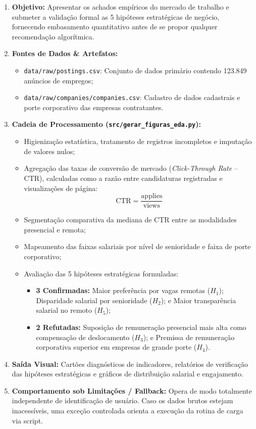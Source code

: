 \begin{enumerate}[label=\textbf{\arabic*.}]
    \item \textbf{Objetivo:} Apresentar os achados empíricos do mercado de trabalho e submeter a validação formal as 5 hipóteses estratégicas de negócio, fornecendo embasamento quantitativo antes de se propor qualquer recomendação algorítmica.
    \item \textbf{Fontes de Dados \& Artefatos:}
    \begin{itemize}
        \item \texttt{data/raw/postings.csv}: Conjunto de dados primário contendo 123.849 anúncios de empregos;
        \item \texttt{data/raw/companies/companies.csv}: Cadastro de dados cadastrais e porte corporativo das empresas contratantes.
    \end{itemize}
    \item \textbf{Cadeia de Processamento (\texttt{src/gerar\_figuras\_eda.py}):}
    \begin{itemize}
        \item Higienização estatística, tratamento de registros incompletos e imputação de valores nulos;
        \item Agregação das taxas de conversão de mercado (\textit{Click-Through Rate} -- CTR), calculadas como a razão entre candidaturas registradas e visualizações de página:
        \begin{equation}
            \text{CTR} = \frac{\text{applies}}{\text{views}}
        \end{equation}
        \item Segmentação comparativa da mediana de CTR entre as modalidades presencial e remota;
        \item Mapeamento das faixas salariais por nível de senioridade e faixa de porte corporativo;
        \item Avaliação das 5 hipóteses estratégicas formuladas:
        \begin{itemize}
            \item \textbf{3 Confirmadas:} Maior preferência por vagas remotas ($H_1$); Disparidade salarial por senioridade ($H_2$); e Maior transparência salarial no remoto ($H_5$);
            \item \textbf{2 Refutadas:} Suposição de remuneração presencial mais alta como compensação de deslocamento ($H_3$); e Premissa de remuneração corporativa superior em empresas de grande porte ($H_4$).
        \end{itemize}
    \end{itemize}
    \item \textbf{Saída Visual:} Cartões diagnósticos de indicadores, relatórios de verificação das hipóteses estratégicas e gráficos de distribuição salarial e engajamento.
    \item \textbf{Comportamento sob Limitações / Fallback:} Opera de modo totalmente independente de identificação de usuário. Caso os dados brutos estejam inacessíveis, uma exceção controlada orienta a execução da rotina de carga via script.
\end{enumerate}

